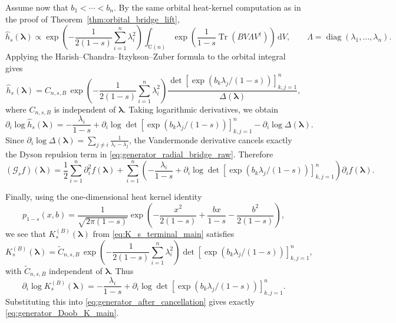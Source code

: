 \documentclass[11pt,a4paper]{article}
\theoremstyle{definition}\newtheorem{definition}[theorem]{Definition}
\theoremstyle{remark}\newtheorem{remark}[theorem]{Remark}
\numberwithin{equation}{section}
\DeclareMathOperator{\Tr}{Tr}
\DeclareMathOperator{\diag}{diag}
\newcommand{\dd}{\mathrm{d}}
\newcommand{\UU}{\mathrm{U}(n)}
\begin{document}
Assume now that $b_1<\cdots<b_n$. By the same orbital heat-kernel computation
as in the proof of Theorem~\ref{thm:orbital_bridge_lift},
\begin{equation}
\widehat h_s(\bm\lambda)
\propto
\exp\!\left(-\frac{1}{2(1-s)}\sum_{i=1}^n\lambda_i^2\right)
\int_{\UU}
\exp\!\left(\frac{1}{1-s}\Tr(BV\Lambda V^\dagger)\right)\,\dd V,
\qquad
\Lambda=\diag(\lambda_1,\dots,\lambda_n).
\end{equation}
Applying the Harish--Chandra--Itzykson--Zuber formula to the orbital integral gives
\begin{equation}
\widehat h_s(\bm\lambda)
=
C_{n,s,B}\,
\exp\!\left(-\frac{1}{2(1-s)}\sum_{i=1}^n\lambda_i^2\right)
\frac{\det[\exp(b_k\lambda_j/(1-s))]_{k,j=1}^n}{\Delta(\bm\lambda)},
\end{equation}
where $C_{n,s,B}$ is independent of $\bm\lambda$. Taking logarithmic
derivatives, we obtain
\begin{equation}
\partial_i\log\widehat h_s(\bm\lambda)
=
-\frac{\lambda_i}{1-s}
+
\partial_i\log\det[\exp(b_k\lambda_j/(1-s))]_{k,j=1}^n
-
\partial_i\log\Delta(\bm\lambda).
\end{equation}
Since
$\partial_i\log\Delta(\bm\lambda)
=
\sum_{j\neq i}\frac{1}{\lambda_i-\lambda_j}$,
the Vandermonde derivative cancels exactly the Dyson repulsion term in
\eqref{eq:generator_radial_bridge_raw}. Therefore
\begin{equation}
\label{eq:generator_after_cancellation}
(\mathcal G_s f)(\bm\lambda)
=
\frac12\sum_{i=1}^n \partial_i^2 f(\bm\lambda)
+
\sum_{i=1}^n
\left(
-\frac{\lambda_i}{1-s}
+
\partial_i\log\det[\exp(b_k\lambda_j/(1-s))]_{k,j=1}^n
\right)\partial_i f(\bm\lambda).
\end{equation}

Finally, using the one-dimensional heat kernel identity
\begin{equation}
p_{1-s}(x,b)
=
\frac{1}{\sqrt{2\pi(1-s)}}
\exp\!\left(
-\frac{x^2}{2(1-s)}
+\frac{bx}{1-s}
-\frac{b^2}{2(1-s)}
\right),
\end{equation}
we see that $K_s^{(B)}(\bm\lambda)$ from
\eqref{eq:K_s_terminal_main} satisfies
\begin{equation}
K_s^{(B)}(\bm\lambda)
=
\widetilde C_{n,s,B}\,
\exp\!\left(-\frac{1}{2(1-s)}\sum_{i=1}^n\lambda_i^2\right)
\det[\exp(b_k\lambda_j/(1-s))]_{k,j=1}^n,
\end{equation}
with $\widetilde C_{n,s,B}$ independent of $\bm\lambda$. Thus
\begin{equation}
\partial_i\log K_s^{(B)}(\bm\lambda)
=
-\frac{\lambda_i}{1-s}
+
\partial_i\log\det[\exp(b_k\lambda_j/(1-s))]_{k,j=1}^n.
\end{equation}
Substituting this into \eqref{eq:generator_after_cancellation} gives exactly
\eqref{eq:generator_Doob_K_main}.
\end{document}
